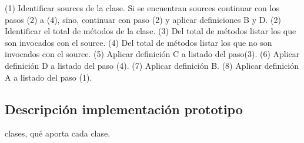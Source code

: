 (1) Identificar sources de la clase. Si se encuentran sources continuar con
los pasos (2) a (4), sino, continuar con paso (2) y aplicar definiciones B y
D.\newline
(2) Identificar el total de métodos de la clase.\newline
(3) Del total de métodos listar los que son invocados con el source.\newline
(4) Del total de métodos listar los que no son invocados con el source.\newline
(5) Aplicar definición C a listado del paso(3).\newline
(6) Aplicar definición D a listado del paso (4).\newline
(7) Aplicar definición B. \newline
(8) Aplicar definición A a listado del paso (1).

\subsection{Descripción implementación prototipo}
clases, qué aporta cada clase.

